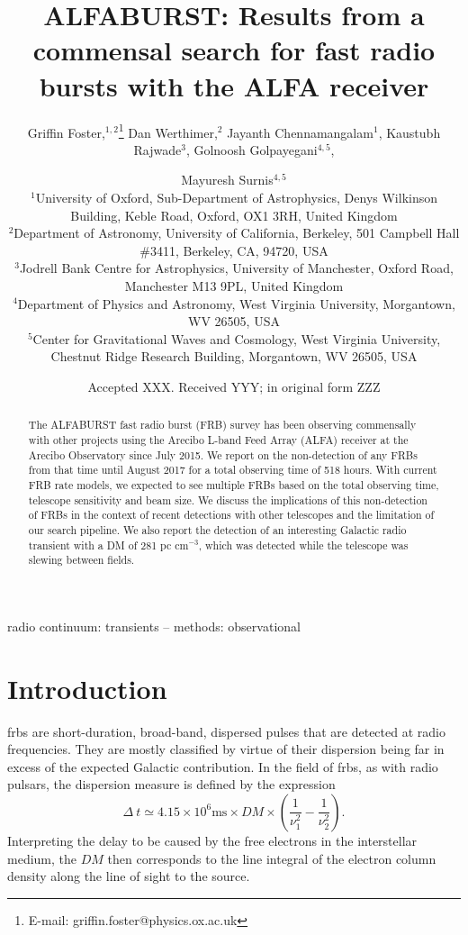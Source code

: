 \documentclass[a4paper,fleqn,usenatbib]{mnras}
\title[The ALFABURST Commensal FRB Survey]{ALFABURST: Results from a commensal search for
fast radio bursts with the ALFA receiver}
\author[G. Foster et al.]{
Griffin Foster,$^{1,2}$\thanks{E-mail: griffin.foster@physics.ox.ac.uk}
Dan Werthimer,$^{2}$
Jayanth Chennamangalam$^{1}$,
Kaustubh Rajwade$^{3}$,
Golnoosh Golpayegani$^{4,5}$,
\and Mayuresh Surnis$^{4,5}$
\\
$^{1}$University of Oxford, Sub-Department of Astrophysics, Denys Wilkinson Building, Keble Road, Oxford, OX1 3RH, United Kingdom\\
$^{2}$Department of Astronomy, University of California, Berkeley, 501 Campbell Hall \#3411, Berkeley, CA, 94720, USA\\
$^{3}$Jodrell Bank Centre for Astrophysics, University of Manchester, Oxford Road, Manchester M13 9PL, United Kingdom\\ 
$^{4}$Department of Physics and Astronomy, West Virginia University, Morgantown, WV 26505, USA\\
$^{5}$Center for Gravitational Waves and Cosmology, West Virginia University, Chestnut Ridge Research Building, Morgantown, WV 26505, USA\\
}
\date{Accepted XXX. Received YYY; in original form ZZZ}
\begin{document}
\label{firstpage}
\pagerange{\pageref{firstpage}--\pageref{lastpage}}
\maketitle

\begin{abstract}
The ALFABURST fast radio burst (FRB) survey has been observing commensally with
other projects using the Arecibo L-band Feed Array (ALFA) receiver at the
Arecibo Observatory since July 2015. We report on the non-detection of any FRBs
from that time until August 2017 for a total observing time of 518 hours.
With current FRB rate models, we expected to see multiple FRBs based on the
total observing time, telescope sensitivity and beam size. We discuss the
implications of this non-detection of FRBs in the context of recent detections
with other telescopes and the limitation of our search pipeline. We also report
the detection of an interesting Galactic radio transient with a DM of 281 pc
cm$^{-3}$, which was detected while the telescope was slewing between fields.
\end{abstract}

\begin{keywords}
radio continuum: transients -- methods: observational
\end{keywords}



\section{Introduction}
\label{sec:intro}

\glspl{frb} are short-duration, broad-band, dispersed pulses that are detected
at radio frequencies. They are mostly classified by virtue of their dispersion
being far in excess of the expected Galactic contribution. In the field of
\glspl{frb}, as with radio pulsars, the dispersion measure is defined by the
expression
%
\begin{equation}
\Delta~t \simeq 4.15 \times 10^6 \textrm{ms} \times DM
\times\left(\frac{1}{\nu_1^2} - \frac{1}{\nu_2^2}\right).
\end{equation}
%
Interpreting the delay to be caused by the free electrons in the
interstellar medium, the $DM$ then corresponds to the line integral of
the electron column density along the line of sight to the source.
\end{document}
